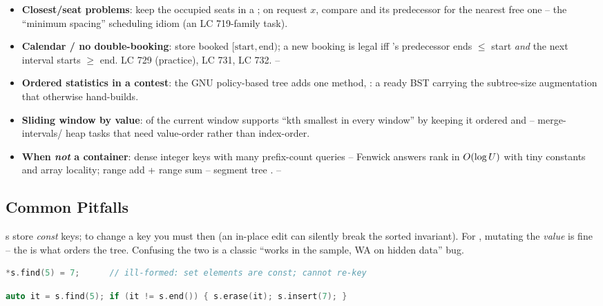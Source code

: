 \begin{itemize}[nosep]
  \item \textbf{Closest/seat problems}: keep the occupied seats in a ; on request $x$,
        compare  and its predecessor for the nearest free one -- the
        ``minimum spacing'' scheduling idiom (an LC 719-family task). \hfill{}
  \item \textbf{Calendar / no double-booking}: store booked $[\text{start},\text{end})$; a new booking
        is legal iff 's predecessor ends $\le$ start \emph{and} the next
        interval starts $\ge$ end. LC 729 (practice), LC 731, LC 732. \hfill{}--
  \item \textbf{Ordered statistics in a contest}: the GNU policy-based  tree adds one
        method, : a ready BST carrying the subtree-size augmentation that
         otherwise hand-builds. \hfill{}
  \item \textbf{Sliding window by value}:  of the current window supports ``kth smallest
        in every window'' by keeping it ordered and  -- merge-intervals/
        heap tasks that need value-order rather than index-order. \hfill{}
  \item \textbf{When \emph{not} a container}: dense integer keys with many prefix-count queries --
        Fenwick  answers rank in $O(\log U)$ with tiny constants and array locality;
        range add + range sum -- segment tree . \hfill{}--
\end{itemize}

\subsection{Common Pitfalls}\label{sec:c05-contests-pitfalls}

\begin{warningbox}
s store \emph{const} keys; to change a key you must  then  (an
in-place edit can silently break the sorted invariant). For , mutating the \emph{value} is
fine -- the  is what orders the tree. Confusing the two is a classic ``works in the sample,
WA on hidden data'' bug.
\end{warningbox}
\begin{lstlisting}[caption={\textcolor{warningred}{WRONG}: editing a key in place breaks ordering}, language=C++, basicstyle=\ttfamily\small]
*s.find(5) = 7;      // ill-formed: set elements are const; cannot re-key
\end{lstlisting}
\begin{lstlisting}[caption={\textcolor{successgreen}{RIGHT}: erase then re-insert}, language=C++, basicstyle=\ttfamily\small]
auto it = s.find(5); if (it != s.end()) { s.erase(it); s.insert(7); }
\end{lstlisting}

